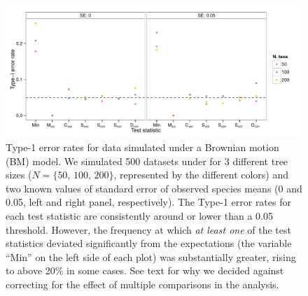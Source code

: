 \begin{figure}[p]
  \centering
  \includegraphics[width=\textwidth]{figs/bm-sim-res}
  \caption[Type-1 error rates for BM simulations]{Type-1 error rates for data simulated under a Brownian motion (BM) model. We simulated 500 datasets under for 3 different tree sizes ($N=\lbrace \text{50, 100, 200} \rbrace $, represented by the different colors) and two known values of standard error of observed species means (0 and 0.05, left and right panel, respectively). The Type-1 error rates for each test statistic are consistently around or lower than a 0.05 threshold. However, the frequency at which \emph{at least one} of the test statistics deviated significantly from the expectations (the variable ``Min'' on the left side of each plot) was substantially greater, rising to above 20\% in some cases. See text for why we decided against correcting for the effect of multiple comparisons in the analysis.}
  \label{fig:bm-sim}
\end{figure}


